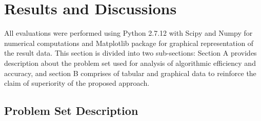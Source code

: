 \documentclass[a4paper,twoside]{article}
\begin{document}




\section{Results and Discussions}

All evaluations were performed using Python 2.7.12 with Scipy\cite{oliphant2007python} and Numpy\cite{van2011numpy} for numerical computations and Matplotlib \cite{Hunter:2007} package for graphical representation of the result data. This section is divided into two sub-sections: Section A provides description about the problem set used for analysis of algorithmic efficiency and accuracy, and section B comprises of tabular and graphical data to reinforce the claim of superiority of the proposed approach.

\subsection{Problem Set Description}
\end{document}
